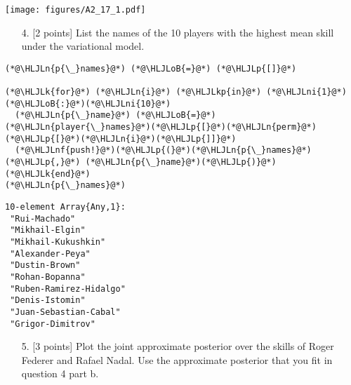 \documentclass[12pt,a4paper]{article}
\newcommand{\HLJLk}[1]{\textcolor[RGB]{148,91,176}{\textbf{#1}}}
\newcommand{\HLJLkp}[1]{\textcolor[RGB]{148,91,176}{\textbf{#1}}}
\newcommand{\HLJLn}[1]{#1}
\newcommand{\HLJLnf}[1]{\textcolor[RGB]{66,102,213}{#1}}
\newcommand{\HLJLni}[1]{\textcolor[RGB]{59,151,46}{#1}}
\newcommand{\HLJLoB}[1]{\textcolor[RGB]{102,102,102}{\textbf{#1}}}
\newcommand{\HLJLp}[1]{#1}
\begin{document}
\texttt{[image: figures/A2\_17\_1.pdf]}

\begin{itemize}
\item[4. ] [2 points] List the names of the 10 players with the highest mean skill under the variational model.

\end{itemize}

\begin{lstlisting}
(*@\HLJLn{p{\_}names}@*) (*@\HLJLoB{=}@*) (*@\HLJLp{[]}@*)

(*@\HLJLk{for}@*) (*@\HLJLn{i}@*) (*@\HLJLkp{in}@*) (*@\HLJLni{1}@*)(*@\HLJLoB{:}@*)(*@\HLJLni{10}@*)
  (*@\HLJLn{p{\_}name}@*) (*@\HLJLoB{=}@*) (*@\HLJLn{player{\_}names}@*)(*@\HLJLp{[}@*)(*@\HLJLn{perm}@*)(*@\HLJLp{[}@*)(*@\HLJLn{i}@*)(*@\HLJLp{]]}@*)
  (*@\HLJLnf{push!}@*)(*@\HLJLp{(}@*)(*@\HLJLn{p{\_}names}@*)(*@\HLJLp{,}@*) (*@\HLJLn{p{\_}name}@*)(*@\HLJLp{)}@*)
(*@\HLJLk{end}@*)
(*@\HLJLn{p{\_}names}@*)
\end{lstlisting}

\begin{lstlisting}
10-element Array{Any,1}:
 "Rui-Machado"          
 "Mikhail-Elgin"        
 "Mikhail-Kukushkin"    
 "Alexander-Peya"       
 "Dustin-Brown"         
 "Rohan-Bopanna"        
 "Ruben-Ramirez-Hidalgo"
 "Denis-Istomin"        
 "Juan-Sebastian-Cabal" 
 "Grigor-Dimitrov"
\end{lstlisting}


\begin{itemize}
\item[5. ] [3 points] Plot the joint approximate posterior over the skills of Roger Federer and Rafael Nadal. Use the approximate posterior that you fit in question 4 part b.

\end{itemize}
\end{document}
